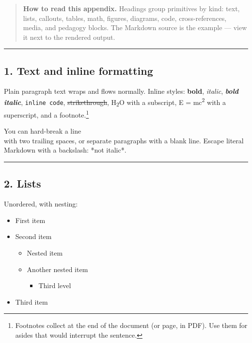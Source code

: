 \documentclass[
]{article}
\providecommand{\tightlist}{%
  \setlength{\itemsep}{0pt}\setlength{\parskip}{0pt}}
\theoremstyle{plain}
\theoremstyle{definition}
\begin{document}
\begin{quote}
\textbf{How to read this appendix.} Headings group primitives by kind:
text, lists, callouts, tables, math, figures, diagrams, code,
cross-references, media, and pedagogy blocks. The Markdown source is the
example --- view it next to the rendered output.
\end{quote}

\begin{center}\rule{0.5\linewidth}{0.5pt}\end{center}

\subsection{1. Text and inline
formatting}\label{text-and-inline-formatting}

Plain paragraph text wraps and flows normally. Inline styles:
\textbf{bold}, \emph{italic}, \textbf{\emph{bold italic}},
\texttt{inline\ code}, \st{strikethrough}, H\textsubscript{2}O with a
subscript, E = mc\textsuperscript{2} with a superscript, and a
footnote.\footnote{Footnotes collect at the end of the document (or
  page, in PDF). Use them for asides that would interrupt the sentence.}

You can hard-break a line\\
with two trailing spaces, or separate paragraphs with a blank line.
Escape literal Markdown with a backslash: *not italic*.

\begin{center}\rule{0.5\linewidth}{0.5pt}\end{center}

\subsection{2. Lists}\label{lists}

Unordered, with nesting:

\begin{itemize}
\tightlist
\item
  First item
\item
  Second item

  \begin{itemize}
  \tightlist
  \item
    Nested item
  \item
    Another nested item

    \begin{itemize}
    \tightlist
    \item
      Third level
    \end{itemize}
  \end{itemize}
\item
  Third item
\end{itemize}
\end{document}
